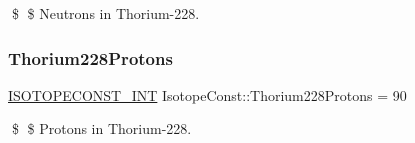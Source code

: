 \$ \$ Neutrons in Thorium-\/228. \mbox{\label{group___isotope_const-_thorium-_th228_gafe026b3a7b52201de21eaf987660fec4}} 
\subsubsection{\texorpdfstring{Thorium228\+Protons}{Thorium228Protons}}
{\footnotesize\ttfamily \mbox{\hyperlink{group___isotope_const-_macros_ga5f18360b3e99483a35c32d789e62621c}{I\+S\+O\+T\+O\+P\+E\+C\+O\+N\+S\+T\+\_\+\+I\+NT}} Isotope\+Const\+::\+Thorium228\+Protons = 90}

\$ \$ Protons in Thorium-\/228. 